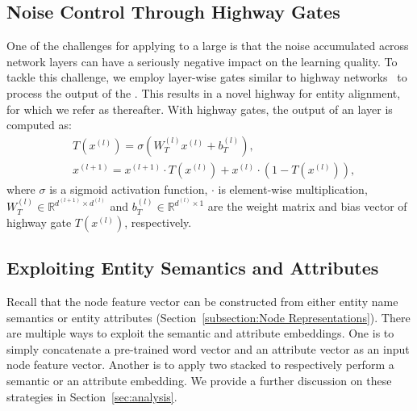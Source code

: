 	\subsection{Noise Control Through Highway Gates}
	\label{section:hgcn}
One of the challenges for applying \GCNs to a large \KG is that the noise accumulated across network layers can have a seriously negative
impact on the learning quality. To tackle this challenge, we employ layer-wise gates similar to highway
networks~\cite{Srivastava2015Highway} to process the output of the \RGCN. This results in a novel highway \RGCN for entity alignment, for
which we refer as \HRGCN thereafter. With highway gates, the output of an \HRGCN layer is computed as:
%
%
	\begin{equation}
	\begin{split}
	&T(x^{(l)})=\sigma(W_T^{(l)}x^{(l)}+b_T^{(l)}), \\
	&x^{(l+1)}=x^{(l+1)} \cdot T(x^{(l)})+x^{(l)} \cdot (1-T(x^{(l)})),
	\end{split}
	\end{equation}
	where $\sigma$ is a sigmoid activation function, $\cdot$ is element-wise multiplication, $W_T^{(l)} \in \mathbb{R}^{d^{(l+1)} \times
d^{(l)}}$ and $b_T^{(l)} \in \mathbb{R}^{d^{(l)} \times 1}$ are the weight matrix and bias vector of highway gate $T(x^{(l)})$,
respectively.


\subsection{Exploiting Entity Semantics and Attributes\label{sec:combine}}
    Recall that the node feature vector can be constructed from either entity name semantics or entity attributes (Section~\ref{subsection:Node
    Representations}). There are multiple ways to exploit the semantic and attribute embeddings. One is to simply concatenate a pre-trained word vector
    and an attribute vector as an input node feature vector. Another is to apply two stacked \HRGCNs to respectively perform a
    semantic or an attribute embedding.  We provide a further discussion on these strategies in Section~\ref{sec:analysis}.

